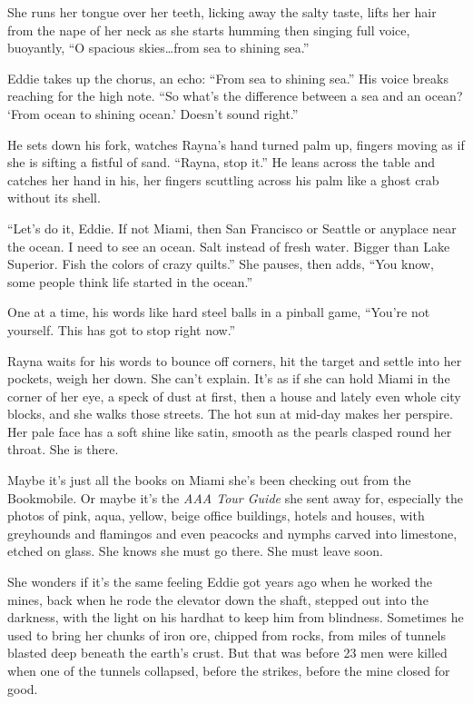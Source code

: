 \documentclass[
]{article}
\begin{document}
She runs her tongue over her teeth, licking away the salty taste, lifts
her hair from the nape of her neck as she starts humming then singing
full voice, buoyantly, ``O spacious skies\ldots from sea to shin­ing
sea.''

Eddie takes up the chorus, an echo: ``From sea to shining sea.'' His
voice breaks reaching for the high note. ``So what's the difference
between a sea and an ocean? `From ocean to shining ocean.' Doesn't sound
right.''

He sets down his fork, watches Rayna's hand turned palm up, fingers
moving as if she is sifting a fistful of sand. ``Rayna, stop it.'' He
leans across the table and catches her hand in his, her fingers
scuttling across his palm like a ghost crab without its shell.

``Let's do it, Eddie. If not Miami, then San Francisco or Seattle or
anyplace near the ocean. I need to see an ocean. Salt instead of fresh
water. Bigger than Lake Superior. Fish the colors of crazy quilts.'' She
pauses, then adds, ``You know, some people think life started in the
ocean.''

One at a time, his words like hard steel balls in a pinball game,
``You're not yourself. This has got to stop right now.''

Rayna waits for his words to bounce off corners, hit the target and
settle into her pockets, weigh her down. She can't explain. It's as if
she can hold Miami in the corner of her eye, a speck of dust at first,
then a house and lately even whole city blocks, and she walks those
streets. The hot sun at mid-day makes her perspire. Her pale face has a
soft shine like satin, smooth as the pearls clasped round her throat.
She is there.

Maybe it's just all the books on Miami she's been checking out from the
Bookmobile. Or maybe it's the \emph{AAA Tour Guide} she sent away for,
especially the photos of pink, aqua, yellow, beige office buildings,
hotels and houses, with greyhounds and flamingos and even peacocks and
nymphs carved into limestone, etched on glass. She knows she must go
there. She must leave soon.

She wonders if it's the same feeling Eddie got years ago when he worked
the mines, back when he rode the elevator down the shaft, stepped out
into the darkness, with the light on his hardhat to keep him from
blindness. Sometimes he used to bring her chunks of iron ore, chipped
from rocks, from miles of tunnels blasted deep beneath the earth's
crust. But that was before 23 men were killed when one of the tunnels
collapsed, before the strikes, before the mine closed for good.
\end{document}
